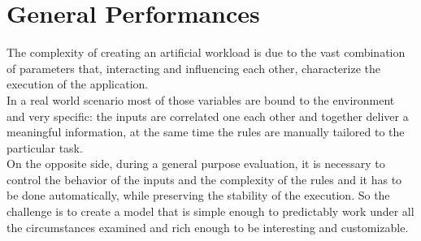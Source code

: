 \section{General Performances}
The complexity of creating an artificial workload is due to the vast combination of parameters that, interacting and influencing each other, characterize the execution of the application.\\
In a real world scenario most of those variables are bound to the environment and very specific: the inputs are correlated one each other and together deliver a meaningful information, at the same time the rules are manually tailored to the particular task.\\
On the opposite side, during a general purpose evaluation, it is necessary to control the behavior of the inputs and the complexity of the rules and it has to be done automatically, while preserving the stability of the execution. So the challenge is to create a model that is simple enough to predictably work under all the circumstances examined and rich enough to be interesting and customizable.

